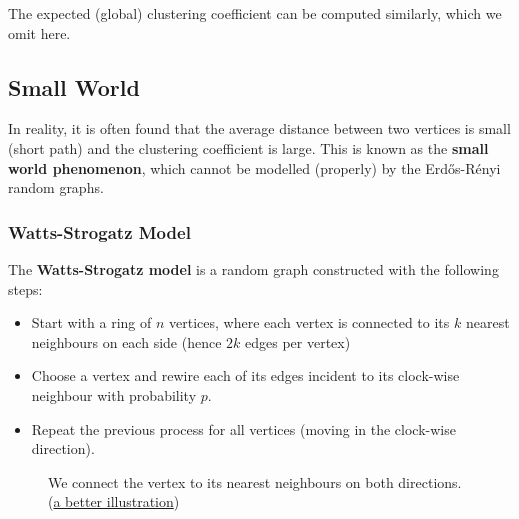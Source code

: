 \documentclass{article}
\begin{document}
The expected (global) clustering coefficient can be computed similarly, which we omit here.  

\subsection{Small World}

In reality, it is often found that the average distance between two vertices is small (short path) and the clustering coefficient is large. This is known as the \textbf{small world phenomenon}, which cannot be modelled (properly) by the Erd\H{o}s-R\'{e}nyi random graphs.  

\subsubsection{Watts-Strogatz Model}
The \textbf{Watts-Strogatz model} is a random graph constructed with the following steps:
\begin{itemize}
    \item Start with a ring of $n$ vertices, where each vertex is connected to its $k$ nearest neighbours on each side (hence $2k$ edges per vertex)
    \item Choose a vertex and rewire each of its edges incident to its clock-wise neighbour with probability $p$.
    \item Repeat the previous process for all vertices (moving in the clock-wise direction).
\end{itemize}

\begin{figure}[H]
    \centering
    \caption{We connect the vertex to its nearest neighbours on both directions. (\href{https://www.kth.se/social/files/5605669af2765468be471eda/lecture\%204\%20\%282015\%29.pdf}{a better illustration})}
    \label{fig:watts-strogatz}
\end{figure}
\end{document}
